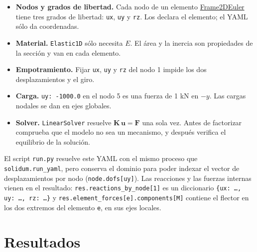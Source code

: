 \documentclass[11pt,oneside]{report}
\begin{document}
\begin{itemize}
  \item \textbf{Nodos y grados de libertad.} Cada nodo de un elemento \href{https://github.com/jretamav/solidum-fem/blob/main/docs/specs/Frame2DEuler.md}{Frame2DEuler} tiene tres grados de libertad: \texttt{ux}, \texttt{uy} y \texttt{rz}. Los declara el elemento; el YAML sólo da coordenadas.
  \item \textbf{Material.} \texttt{Elastic1D} sólo necesita $E$. El área y la inercia son propiedades de la sección y van en cada elemento.
  \item \textbf{Empotramiento.} Fijar \texttt{ux}, \texttt{uy} y \texttt{rz} del nodo 1 impide los dos desplazamientos y el giro.
  \item \textbf{Carga.} \texttt{uy: -1000.0} en el nodo 5 es una fuerza de 1 kN en $-y$. Las cargas nodales se dan en ejes globales.
  \item \textbf{Solver.} \texttt{LinearSolver} resuelve $\mathbf K\,\mathbf u = \mathbf F$ una sola vez. Antes de factorizar comprueba que el modelo no sea un mecanismo, y después verifica el equilibrio de la solución.
\end{itemize}

El script \texttt{run.py} resuelve este YAML con el mismo proceso que \texttt{solidum.run\_yaml}, pero conserva el dominio para poder indexar el vector de desplazamientos por nodo (\texttt{node.dofs[\textquotedbl{}uy\textquotedbl{}]}). Las reacciones y las fuerzas internas vienen en el resultado: \texttt{res.\allowbreak{}reactions\_\allowbreak{}by\_\allowbreak{}node[1]} es un diccionario \texttt{\{\textquotedbl{}ux\textquotedbl{}: \ldots{}, \textquotedbl{}uy\textquotedbl{}: \ldots{}, \textquotedbl{}rz\textquotedbl{}: \ldots{}\}} y \texttt{res.\allowbreak{}element\_\allowbreak{}forces[e].\allowbreak{}components[\textquotedbl{}M\textquotedbl{}]} contiene el flector en los dos extremos del elemento \texttt{e}, en sus ejes locales.

\section{Resultados}
\end{document}
